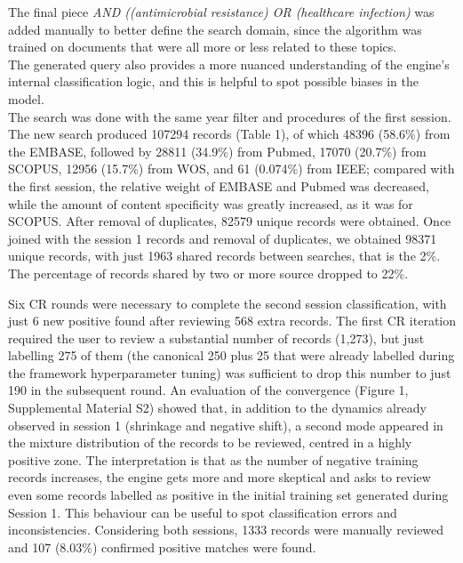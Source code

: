 \documentclass{article}
\begin{document}
The final piece \emph{AND ((antimicrobial resistance) OR (healthcare
infection)} was added manually to better define the search domain, since
the algorithm was trained on documents that were all more or less
related to these topics.\\
The generated query also provides a more nuanced understanding of the
engine's internal classification logic, and this is helpful to spot
possible biases in the model.\\

The search was done with the same year filter and procedures of the
first session.\\

The new search produced 107294 records (Table 1), of which 48396
(58.6\%) from the EMBASE, followed by 28811 (34.9\%) from Pubmed, 17070
(20.7\%) from SCOPUS, 12956 (15.7\%) from WOS, and 61 (0.074\%) from
IEEE; compared with the first session, the relative weight of EMBASE and
Pubmed was decreased, while the amount of content specificity was
greatly increased, as it was for SCOPUS. After removal of duplicates,
82579 unique records were obtained. Once joined with the session 1
records and removal of duplicates, we obtained 98371 unique records,
with just 1963 shared records between searches, that is the 2\%. The
percentage of records shared by two or more source dropped to 22\%.

Six CR rounds were necessary to complete the second session
classification, with just 6 new positive found after reviewing 568 extra
records. The first CR iteration required the user to review a
substantial number of records (1,273), but just labelling 275 of them
(the canonical 250 plus 25 that were already labelled during the
framework hyperparameter tuning) was sufficient to drop this number to
just 190 in the subsequent round. An evaluation of the convergence
(Figure 1, Supplemental Material S2) showed that, in addition to the
dynamics already observed in session 1 (shrinkage and negative shift), a
second mode appeared in the mixture distribution of the records to be
reviewed, centred in a highly positive zone. The interpretation is that
as the number of negative training records increases, the engine gets
more and more skeptical and asks to review even some records labelled as
positive in the initial training set generated during Session 1. This
behaviour can be useful to spot classification errors and
inconsistencies. Considering both sessions, 1333 records were manually
reviewed and 107 (8.03\%) confirmed positive matches were found.
\end{document}
